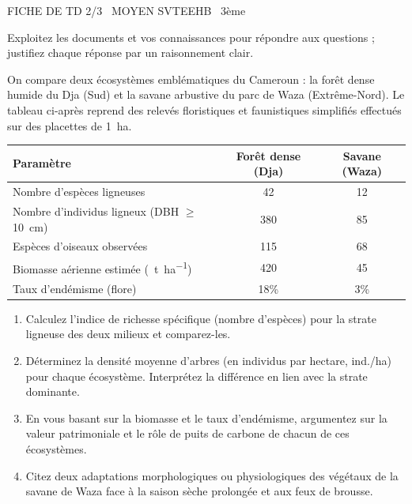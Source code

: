 \documentclass[11pt]{article}
\begin{document}
\begin{tcolorbox}[enhanced,colback=popink,colframe=popink,arc=10pt,boxrule=0pt,left=12pt,right=12pt,top=9pt,bottom=9pt]
{\color{white}\popxbold\small FICHE DE TD 2/3 \textbullet\ MOYEN \hfill SVTEEHB \textbullet\ 3ème\par}
\end{tcolorbox}
\vspace{4pt}
\noindent Exploitez les documents et vos connaissances pour répondre aux questions ; justifiez chaque réponse par un raisonnement clair.

\begin{exercice}
On compare deux écosystèmes emblématiques du Cameroun : la forêt dense humide du Dja (Sud) et la savane arbustive du parc de Waza (Extrême-Nord). Le tableau ci-après reprend des relevés floristiques et faunistiques simplifiés effectués sur des placettes de \SI{1}{\hectare}.

\begin{tabular}{|l|c|c|}
\hline
\textbf{Paramètre} & \textbf{Forêt dense (Dja)} & \textbf{Savane (Waza)} \\
\hline
Nombre d'espèces ligneuses & 42 & 12 \\
\hline
Nombre d'individus ligneux (DBH $\ge$ \SI{10}{\centi\meter}) & 380 & 85 \\
\hline
Espèces d'oiseaux observées & 115 & 68 \\
\hline
Biomasse aérienne estimée (\SI{}{\tonne\per\hectare}) & 420 & 45 \\
\hline
Taux d'endémisme (flore) & 18\% & 3\% \\
\hline
\end{tabular}

\begin{enumerate}
\item Calculez l'indice de richesse spécifique (nombre d'espèces) pour la strate ligneuse des deux milieux et comparez-les.
\item Déterminez la densité moyenne d'arbres (en individus par hectare, ind./ha) pour chaque écosystème. Interprétez la différence en lien avec la strate dominante.
\item En vous basant sur la biomasse et le taux d'endémisme, argumentez sur la valeur patrimoniale et le rôle de puits de carbone de chacun de ces écosystèmes.
\item Citez deux adaptations morphologiques ou physiologiques des végétaux de la savane de Waza face à la saison sèche prolongée et aux feux de brousse.
\end{enumerate}
\end{exercice}
\end{document}
